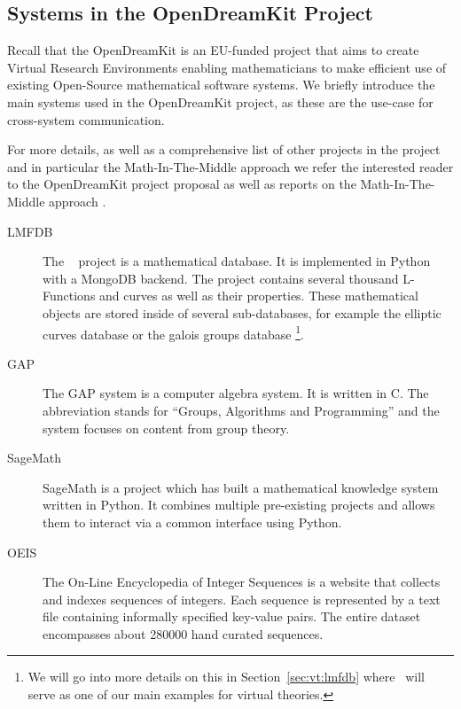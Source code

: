 \subsection{Systems in the OpenDreamKit Project}\label{sec:mitm:systems}


Recall that the OpenDreamKit \cite{OpenDreamKit:on} is an EU-funded project that aims to create Virtual Research Environments enabling mathematicians to make efficient use of existing Open-Source mathematical software systems.
We briefly introduce the main systems used in the OpenDreamKit project, as these are the use-case for cross-system communication. 

For more details, as well as a comprehensive list of other projects in the project and in particular the Math-In-The-Middle approach we refer the interested reader to the OpenDreamKit project proposal \cite{ODKproposal:on} as well as reports on the Math-In-The-Middle approach \cite{DehKohKon:iop16}.

\begin{description}
  \item[LMFDB]
    The \lmfdb\ \cite{lmfdb} project is a mathematical database. 
    It is implemented in Python with a MongoDB backend. 
    The project contains several thousand L-Functions and curves as well as their properties.
    These mathematical objects are stored inside of several sub-databases, for example the elliptic curves database or the galois groups database
    \footnote{We will go into more details on this in Section~\ref{sec:vt:lmfdb} where \lmfdb\ will serve as one of our main examples for virtual theories. }. 
  \item[GAP]
    The GAP system \cite{gap} is a computer algebra system. 
    It is written in C. 
    The abbreviation stands for ``Groups, Algorithms and Programming'' and the system focuses on content from group theory. 
  \item[SageMath]
    SageMath \cite{sagemath} is a project which has built a mathematical knowledge system written in Python. 
    It combines multiple pre-existing projects and allows them to interact via a common interface using Python. 
  \item[OEIS]
    The On-Line Encyclopedia of Integer Sequences \cite{oeis} is a website that collects and indexes sequences of integers. 
    Each sequence is represented by a text file containing informally specified key-value pairs. 
    The entire dataset encompasses about 280000 hand curated sequences. 
\end{description}

